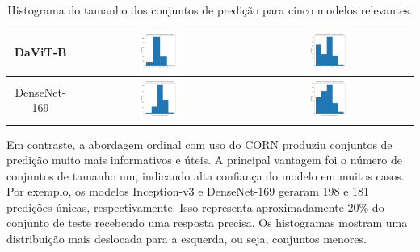 \begin{table}[!htbp]
\begin{tabular}{|c|c|c|}
        DaViT-B & \includegraphics[width=0.25\textwidth]{figs/conformal_prediction/davit_base-msft_in1k_cp_cross_entropy.png} & \includegraphics[width=0.25\textwidth]{figs/conformal_prediction/davit_base-msft_in1k_cp_corn.png} \\ \hline
        DenseNet-169 & \includegraphics[width=0.25\textwidth]{figs/conformal_prediction/densenet169_cp_cross_entropy.png} & \includegraphics[width=0.25\textwidth]{figs/conformal_prediction/densenet169_cp_corn.png} \\ \hline
    \end{tabular}
    \caption{Histograma do tamanho dos conjuntos de predição para cinco modelos relevantes.}
    \label{tab:cp_set_sizes}
\end{table}

Em contraste, a abordagem ordinal com uso do CORN produziu conjuntos de predição muito mais informativos e úteis. A principal vantagem foi o número de conjuntos de tamanho um, indicando alta confiança do modelo em muitos casos. Por exemplo, os modelos Inception-v3 e DenseNet-169 geraram 198 e 181 predições únicas, respectivamente. Isso representa aproximadamente 20\% do conjunto de teste recebendo uma resposta precisa. Os histogramas mostram uma distribuição mais deslocada para a esquerda, ou seja, conjuntos menores.


